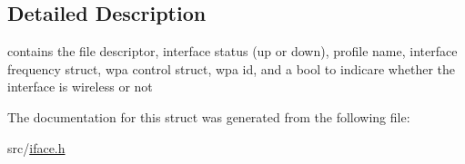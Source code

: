 \subsection{Detailed Description}
contains the file descriptor, interface status (up or down), profile name, interface frequency struct, wpa control struct, wpa id, and a bool to indicare whether the interface is wireless or not 

The documentation for this struct was generated from the following file\-:\begin{DoxyCompactItemize}
\item 
src/\hyperlink{iface_8h}{iface.\-h}\end{DoxyCompactItemize}
